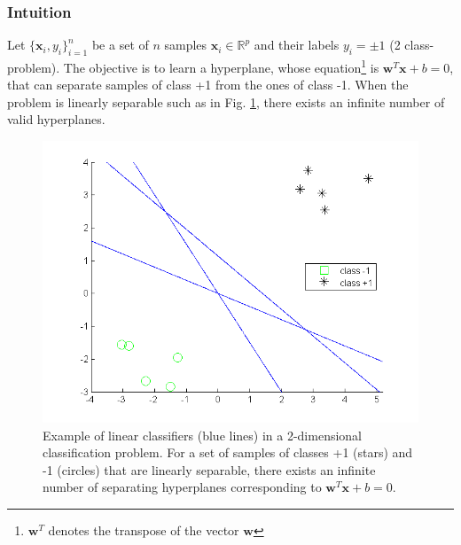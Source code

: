 \subsubsection{Intuition}
Let $\{\textbf{x}_i,y_i\}_{i=1}^n$ be a set of $n$ samples $\textbf{x}_i \in \mathbb{R}^p$ and their labels $y_i= \pm 1$ (2 class-problem). The objective is to learn a hyperplane, whose equation\footnote{$\textbf{w}^T$ denotes the transpose of the vector $\textbf{w}$} is $\textbf{w}^T \textbf{x} + b = 0$, that can separate samples of class +1 from the ones of class -1. When the problem is linearly separable such as in Fig. \ref{fig:Plusieurs_separatrice_lineaire}, there exists an infinite number of valid hyperplanes. 

\begin{figure}[h!]
\centering
\includegraphics[width=0.5\linewidth]{images/Plusieurs_separatrice_lineaire2}
\caption[Example of linear classifiers (blue lines) in a 2-dimensional classification problem.]{Example of linear classifiers (blue lines) in a 2-dimensional classification problem. For a set of samples of classes +1 (stars) and -1 (circles) that are linearly separable, there exists an infinite number of separating hyperplanes corresponding to $\textbf{w}^T\textbf{x} + b = 0.$ }
\label{fig:Plusieurs_separatrice_lineaire}
\end{figure}

